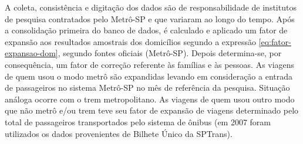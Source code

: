 \begin{table}[htb]
\end{table}

A coleta, consistência e digitação dos dados são de responsabilidade de institutos de pesquisa contratados pelo Metrô-SP e que variaram ao longo do tempo. Após a consolidação primeira do banco de dados, é calculado e aplicado um fator de expansão aos resultados amostrais dos domicílios segundo a expressão \eqref{eq:fator-expansao-dom}, segundo fontes oficiais (Metrô-SP).
Depois determina-se, por consequência, um fator de correção referente às famílias e às pessoas. As viagens de quem usou o modo metrô são expandidas levando em consideração a entrada de passageiros no sistema Metrô-SP no mês de referência da pesquisa. Situação análoga ocorre com o trem metropolitano. As viagens de quem usou outro modo que não metrô e/ou trem teve seu fator de expansão de viagens determinado pelo total de passageiros transportados pelo sistema de ônibus (em 2007 foram utilizados os dados provenientes de Bilhete Único da SPTrans).

